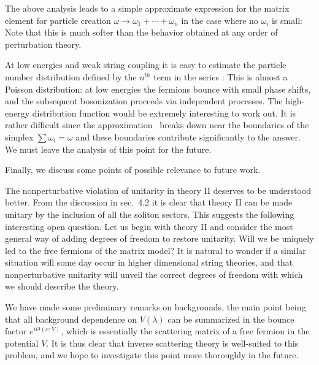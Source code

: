 The above analysis leads to a simple approximate expression for the 
matrix element for particle creation
$\omega\to \omega_1+\cdots+\omega_n$
in the case where no $\omega_i$ is small:
\eqn{}
Note that this is much softer than the behavior obtained at any order
of perturbation theory. 
 
 
At low energies and weak string coupling it is easy to estimate
the particle number distribution defined by the $n^{th}$
term in the series \unitonon :
\eqn{}
This is almost a Poisson distribution: at low energies the fermions
bounce with small phase shifts, and the subsequent bosonization proceeds
via independent processes. The high-energy distribution function 
would be extremely interesting to work out. It is rather difficult 
since the approximation \lrgeng\ breaks down near the boundaries
of the simplex $\sum \omega_i=\omega$ and these boundaries contribute
significantly to the answer. We must leave the analysis of this point
for the future. 
 
 
Finally, we discuss some points of possible relevance to future work.
 
The nonperturbative violation of
unitarity in theory II deserves to be understood 
better. From the discussion in sec.~4.2 it is clear 
that theory II can be made unitary by the inclusion of all the soliton 
sectors. This suggests the following 
interesting open question. Let us begin with theory II and 
consider the most general way of adding degrees of freedom  
to restore unitarity. Will we be uniquely led to the free fermions of the
matrix model? It is natural to wonder if a similar situation will some day 
occur in higher dimensional string theories, and that nonperturbative 
unitarity will unveil the correct degrees of freedom with which 
we should describe the theory.
 
We have made some preliminary remarks on backgrounds, 
the main point being that all background dependence on 
$V(\lambda)$ can be summarized in the bounce factor
$e^{i \Theta(x;V)}$, which 
is essentially the scattering matrix of a free fermion
in the potential $V$. 
It is thus clear that
inverse scattering theory is well-suited to this problem, and 
we hope to investigate this point more thoroughly in the future.%
 
